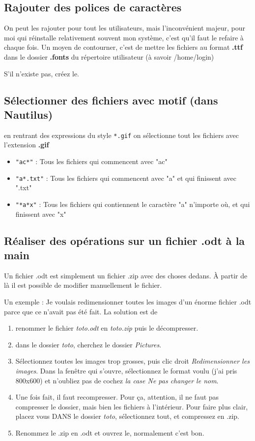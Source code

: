 \documentclass[a4paper,twoside]{article}
\begin{document}
\subsection{Rajouter des polices de caractères}
On peut les rajouter pour tout les utilisateurs, mais l'inconvénient majeur, pour moi qui réinstalle relativement souvent mon système, c'est qu'il faut le refaire à chaque fois. Un moyen de contourner, c'est de mettre les fichiers au format \textbf{.ttf} dans le dossier \textbf{.fonts} du répertoire utilisateur (à savoir /home/login)

\begin{remarque}
S'il n'existe pas, créez le.
\end{remarque}

\subsection{Sélectionner des fichiers avec motif (dans Nautilus)}
en rentrant des expressions du style \verb|*.gif| on sélectionne tout les fichiers avec l'extension \textbf{.gif}
\begin{itemize}
 \item \verb|"ac*"| : Tous les fichiers qui commencent avec "ac"
\item \verb|"a*.txt"| : Tous les fichiers qui commencent avec "a" et qui finissent avec ".txt"
\item \verb|"*a*x"| : Tous les fichiers qui contiennent le caractère "a" n'importe où, et qui finissent avec "x"
\end{itemize}

\subsection{Réaliser des opérations sur un fichier .odt à la main}
Un fichier .odt est simplement un fichier .zip avec des choses dedans. À partir de là il est possible de modifier manuellement le fichier. 

Un exemple : Je voulais redimensionner toutes les images d'un énorme fichier .odt parce que ce n'avait pas été fait. La solution est de 
\begin{enumerate}
\item renommer le fichier \textit{toto.odt} en \textit{toto.zip} puis le décompresser.
\item dans le dossier \textit{toto}, cherchez le dossier \textit{Pictures}. 
\item Sélectionnez toutes les images trop grosses, puis clic droit \textit{Redimensionner les images}. Dans la fenêtre qui s'ouvre, sélectionnez le format voulu (j'ai pris 800x600) et n'oubliez pas de cochez \textit{la case Ne pas changer le nom}.
\item Une fois fait, il faut recompresser. Pour ça, attention, il ne faut pas compresser le dossier, mais bien les fichiers à l'intérieur. Pour faire plus clair, placez vous DANS le dossier \textit{toto}, sélectionnez tout, et compressez en .zip. 
\item Renommez le .zip en .odt et ouvrez le, normalement c'est bon.
\end{enumerate}
\end{document}
